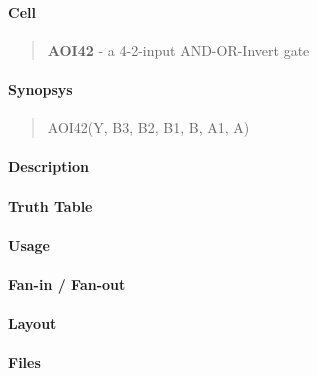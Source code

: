 \label{AOI42}
\paragraph{Cell}
\begin{quote}
    \textbf{AOI42} - a 4-2-input AND-OR-Invert gate
\end{quote}

\paragraph{Synopsys}
\begin{quote}
    AOI42(Y, B3, B2, B1, B, A1, A)
\end{quote}

\paragraph{Description}

%

\paragraph{Truth Table}
%

\paragraph{Usage}

\paragraph{Fan-in / Fan-out}

\paragraph{Layout}

\paragraph{Files}
